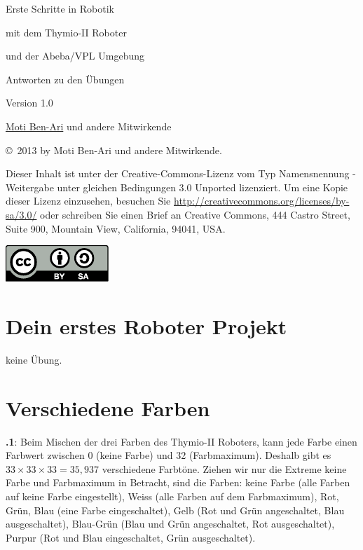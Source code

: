 \documentclass[12pt,a4paper,ngerman]{article}
\begin{document}
\thispagestyle{empty}

\begin{center}
\begin{bfseries}

\begin{Large}
Erste Schritte in Robotik

mit dem Thymio-II Roboter

und der Abeba/VPL Umgebung

\bigskip

Antworten zu den Übungen

\end{Large}

Version 1.0

\bigskip

\href{http://www.weizmann.ac.il/sci-tea/benari/}{Moti Ben-Ari} und andere Mitwirkende

\end{bfseries}
\end{center}

\bigskip

\copyright{}\  2013 by Moti Ben-Ari und andere Mitwirkende. 

Dieser Inhalt ist unter der Creative-Commons-Lizenz vom Typ Namensnennung -
Weitergabe unter gleichen Bedingungen 3.0 Unported lizenziert.
Um eine Kopie dieser Lizenz einzusehen, besuchen Sie \url{http://creativecommons.org/licenses/by-sa/3.0/} oder schreiben Sie einen Brief an Creative Commons, 444 Castro Street, Suite 900, Mountain View, California, 94041, USA.

\begin{center}
\hspace{6pt}\includegraphics[width=.2\textwidth]{../images/by-sa}
\end{center}


\section{Dein erstes Roboter Projekt}

keine Übung.

\section{Verschiedene Farben}

\textbf{\thesection.1}: 
Beim Mischen der drei Farben des Thymio-II Roboters, kann jede Farbe einen Farbwert zwischen 0 (keine Farbe) und 32 (Farbmaximum). Deshalb gibt es $33  \times 33  \times 33=35,937$ verschiedene Farbtöne. Ziehen wir nur die Extreme keine Farbe und Farbmaximum in Betracht, sind die Farben: keine Farbe (alle Farben auf keine Farbe eingestellt), Weiss (alle Farben auf dem Farbmaximum), Rot, Grün, Blau (eine Farbe eingeschaltet), Gelb (Rot und Grün angeschaltet, Blau ausgeschaltet), Blau-Grün (Blau und Grün angeschaltet, Rot ausgeschaltet), Purpur (Rot und Blau eingeschaltet, Grün ausgeschaltet).
\end{document}
